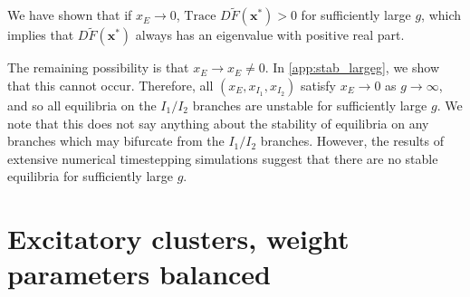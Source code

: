 \documentclass[reqno]{siamonline190516}
\newcommand{\xvec}{\mathbf{x}}
\begin{document}
We have shown that if $x_E \rightarrow 0$, $\text{Trace }D\tilde{F}(\xvec^*) > 0$ for sufficiently large $g$, which implies that $D\tilde{F}(\xvec^*)$ always has an eigenvalue with positive real part. 

The remaining possibility is that $x_E \rightarrow \hat{x}_E \neq 0$. In \cref{app:stab_largeg}, we show that this cannot occur. Therefore, all $(x_E,x_{I_1},x_{I_2})$ satisfy $x_E \rightarrow 0$ as $g\rightarrow \infty$, and so all equilibria on the $I_1/I_2$ branches are unstable for sufficiently large $g$. We note that this does not say anything about the stability of equilibria on any branches which may bifurcate from the $I_1/I_2$ branches. However, the results of extensive numerical timestepping simulations suggest that there are no stable equilibria for sufficiently large $g$.

\section{Excitatory clusters, weight parameters balanced}\label{sec:Eclusters}
\end{document}
